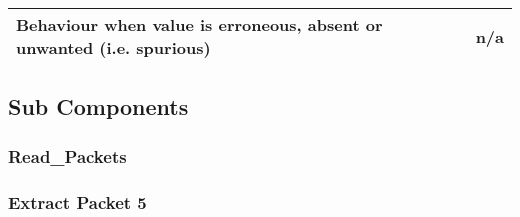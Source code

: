\begin{longtable}{p{}p{}}
 \\
\midrule
Behaviour when value is erroneous, absent or unwanted (i.e. spurious) & n/a \\
\bottomrule
\end{longtable}


\subsection{Sub Components}

\subsubsection{Read\_Packets}


\subsubsection{Extract Packet 5}



%